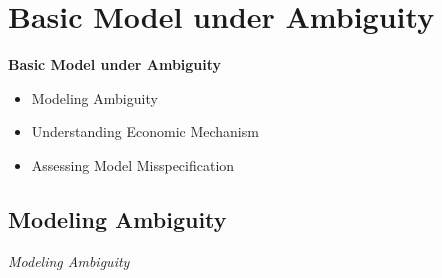 \section{Basic Model under Ambiguity}
\begin{frame}\begin{center}
\LARGE\textbf{Basic Model under Ambiguity}
\end{center}\end{frame}
\begin{frame}
\begin{itemize}\setlength\itemsep{1em}
\item Modeling Ambiguity\medskip
\item Understanding Economic Mechanism\medskip
\item Assessing Model Misspecification\medskip
\end{itemize}
\end{frame}
\subsection{Modeling Ambiguity}
\begin{frame}\begin{center}
\LARGE\textit{Modeling Ambiguity}
\end{center}\end{frame}


